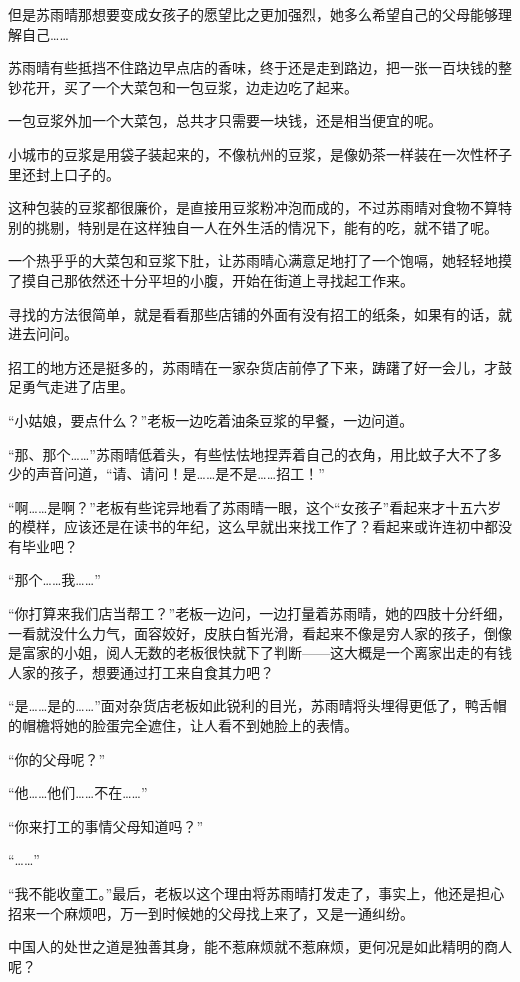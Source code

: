 但是苏雨晴那想要变成女孩子的愿望比之更加强烈，她多么希望自己的父母能够理解自己……

苏雨晴有些抵挡不住路边早点店的香味，终于还是走到路边，把一张一百块钱的整钞花开，买了一个大菜包和一包豆浆，边走边吃了起来。

一包豆浆外加一个大菜包，总共才只需要一块钱，还是相当便宜的呢。

小城市的豆浆是用袋子装起来的，不像杭州的豆浆，是像奶茶一样装在一次性杯子里还封上口子的。

这种包装的豆浆都很廉价，是直接用豆浆粉冲泡而成的，不过苏雨晴对食物不算特别的挑剔，特别是在这样独自一人在外生活的情况下，能有的吃，就不错了呢。

一个热乎乎的大菜包和豆浆下肚，让苏雨晴心满意足地打了一个饱嗝，她轻轻地摸了摸自己那依然还十分平坦的小腹，开始在街道上寻找起工作来。

寻找的方法很简单，就是看看那些店铺的外面有没有招工的纸条，如果有的话，就进去问问。

招工的地方还是挺多的，苏雨晴在一家杂货店前停了下来，踌躇了好一会儿，才鼓足勇气走进了店里。

“小姑娘，要点什么？”老板一边吃着油条豆浆的早餐，一边问道。

“那、那个……”苏雨晴低着头，有些怯怯地捏弄着自己的衣角，用比蚊子大不了多少的声音问道，“请、请问！是……是不是……招工！”

“啊……是啊？”老板有些诧异地看了苏雨晴一眼，这个“女孩子”看起来才十五六岁的模样，应该还是在读书的年纪，这么早就出来找工作了？看起来或许连初中都没有毕业吧？

“那个……我……”

“你打算来我们店当帮工？”老板一边问，一边打量着苏雨晴，她的四肢十分纤细，一看就没什么力气，面容姣好，皮肤白皙光滑，看起来不像是穷人家的孩子，倒像是富家的小姐，阅人无数的老板很快就下了判断——这大概是一个离家出走的有钱人家的孩子，想要通过打工来自食其力吧？

“是……是的……”面对杂货店老板如此锐利的目光，苏雨晴将头埋得更低了，鸭舌帽的帽檐将她的脸蛋完全遮住，让人看不到她脸上的表情。

“你的父母呢？”

“他……他们……不在……”

“你来打工的事情父母知道吗？”

“……”

“我不能收童工。”最后，老板以这个理由将苏雨晴打发走了，事实上，他还是担心招来一个麻烦吧，万一到时候她的父母找上来了，又是一通纠纷。

中国人的处世之道是独善其身，能不惹麻烦就不惹麻烦，更何况是如此精明的商人呢？

